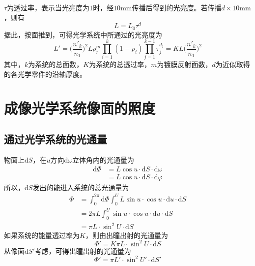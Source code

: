 \documentclass[cn,10pt,chinesefont=founder,math=mtpro2,cite=super,toc=onecol,twoside,openany]{elegantbook}
\begin{document}
$\tau$为透过率，表示当光亮度为$1$时，经$10\mathrm{mm}$传播后得到的光亮度。若传播$d\times10\mathrm{mm}$，则有
\begin{equation}
L=L_0\tau^d
\end{equation}
据此，按面推到，可得光学系统中所通过的光亮度为
\begin{equation}
L'=\bigg(\frac{n'_k}{n_1}\bigg)^2L\rho^m_r\prod^k_{i=1}(1-\rho_i)\prod^{k-1}_{j=1}\tau^{d_j}_{j}=KL\bigg(\frac{n'_k}{n_1}\bigg)^2
\end{equation}
其中，$k$为系统的总面数，$K$为系统的总透过率，$m$为镀膜反射面数，$d$为近似取得的各光学零件的沿轴厚度。

\section{成像光学系统像面的照度}
\subsection{通过光学系统的光通量}
物面上$\mathrm{d}S$，在$u$方向$\mathrm{d}\omega$立体角内的光通量为
\begin{equation}
\begin{aligned}
\mathrm{d}\varPhi&=L\cos u\cdot\mathrm{d}S\cdot\mathrm{d}\omega\\
&=L\cos u\cdot\mathrm{d}S\cdot\mathrm{d}\varphi
\end{aligned}
\end{equation}
所以，$\mathrm{d}S$发出的能进入系统的总光通量为
\begin{equation}
\begin{aligned}
\varPhi&=\int^{2\pi}_0\mathrm{d}\varPhi\int^U_0L\sin u\cdot\cos u\cdot\mathrm{d}u\cdot\mathrm{d}S\\
&=2\pi L\int^U_0\sin u\cdot\cos u\cdot\mathrm{d}u\cdot\mathrm{d}S\\
&=\pi L\cdot\sin^2U\cdot\mathrm{d}S
\end{aligned}
\end{equation}
如果系统的能量透过率为$K$，则由出瞳出射的光通量为
\begin{equation}
\varPhi'=K\pi L\cdot\sin^2U\cdot\mathrm{d}S
\end{equation}
从像面$\mathrm{d}S'$考虑，可得出瞳出射的光通量为
\begin{equation}
\varPhi'=\pi L'\cdot\sin^2U'\cdot\mathrm{d}S'
\end{equation}
\end{document}

